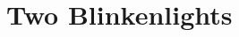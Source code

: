\documentclass[a5paper,oneside]{scrbook}
\begin{document}
	



%

%

%

\chapter{Two Blinkenlights\label{ch3}}


%

%

%
\end{document}
